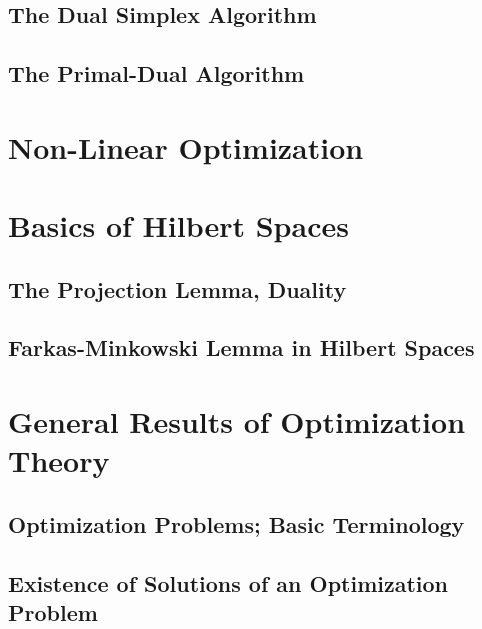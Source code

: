 \documentclass[a4paper]{article}
\begin{document}
\subsection{ The Dual Simplex Algorithm} %

\subsection{ The Primal-Dual Algorithm} %


\newpage
\section*{Non-Linear Optimization}
\section{Basics of Hilbert Spaces}
\subsection{ The Projection Lemma, Duality} %

\subsection{ Farkas-Minkowski Lemma in Hilbert Spaces} %


\newpage
\section{General Results of Optimization Theory}
\subsection{ Optimization Problems; Basic Terminology} %

\subsection{ Existence of Solutions of an Optimization Problem} %
\end{document}
